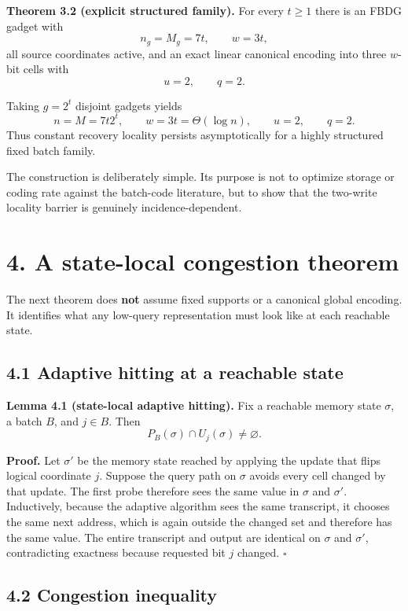 \documentclass[
]{article}
\begin{document}
\textbf{Theorem 3.2 (explicit structured family).} For every \(t\ge1\)
there is an FBDG gadget with \[
n_g=M_g=7t,\qquad w=3t,
\] all source coordinates active, and an exact linear canonical encoding
into three \(w\)-bit cells with \[
u=2,\qquad q=2.
\]

Taking \(g=2^t\) disjoint gadgets yields \[
n=M=7t2^t,
\qquad
w=3t=\Theta(\log n),
\qquad
u=2,
\qquad
q=2.
\] Thus constant recovery locality persists asymptotically for a highly
structured fixed batch family.

The construction is deliberately simple. Its purpose is not to optimize
storage or coding rate against the batch-code literature, but to show
that the two-write locality barrier is genuinely incidence-dependent.

\hypertarget{a-state-local-congestion-theorem}{%
\section{4. A state-local congestion
theorem}\label{a-state-local-congestion-theorem}}

The next theorem does \textbf{not} assume fixed supports or a canonical
global encoding. It identifies what any low-query representation must
look like at each reachable state.

\hypertarget{adaptive-hitting-at-a-reachable-state}{%
\subsection{4.1 Adaptive hitting at a reachable
state}\label{adaptive-hitting-at-a-reachable-state}}

\textbf{Lemma 4.1 (state-local adaptive hitting).} Fix a reachable
memory state \(\sigma\), a batch \(B\), and \(j\in B\). Then \[
P_B(\sigma)\cap U_j(\sigma)\ne\varnothing.
\]

\textbf{Proof.} Let \(\sigma'\) be the memory state reached by applying
the update that flips logical coordinate \(j\). Suppose the query path
on \(\sigma\) avoids every cell changed by that update. The first probe
therefore sees the same value in \(\sigma\) and \(\sigma'\).
Inductively, because the adaptive algorithm sees the same transcript, it
chooses the same next address, which is again outside the changed set
and therefore has the same value. The entire transcript and output are
identical on \(\sigma\) and \(\sigma'\), contradicting exactness because
requested bit \(j\) changed. \(\square\)

\hypertarget{congestion-inequality}{%
\subsection{4.2 Congestion inequality}\label{congestion-inequality}}
\end{document}
